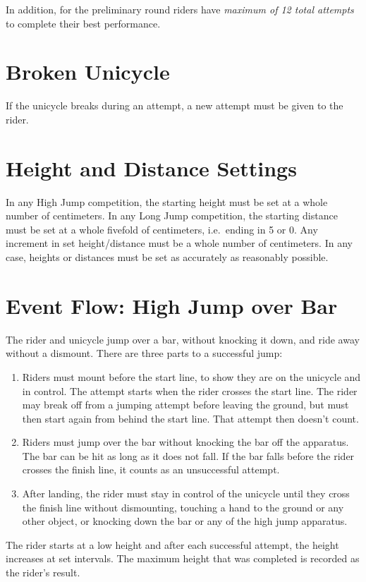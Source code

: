 In addition, for the preliminary round riders have \textit{maximum of 12 total attempts} to complete their best performance.

\section{Broken Unicycle}
If the unicycle breaks during an attempt, a new attempt must be given to the rider.

\section{Height and Distance Settings}

In any High Jump competition, the starting height must be set at a whole number of centimeters.
In any Long Jump competition, the starting distance must be set at a whole fivefold of centimeters, i.e.\ ending in 5 or 0.
Any increment in set height/distance must be a whole number of centimeters.
In any case, heights or distances must be set as accurately as reasonably possible.

\section{Event Flow: High Jump over Bar}
The rider and unicycle jump over a bar, without knocking it down, and ride away without a dismount.
There are three parts to a successful jump:
\begin{enumerate}
\item Riders must mount before the start line, to show they are on the unicycle and in control.
The attempt starts when the rider crosses the start line.
The rider may break off from a jumping attempt before leaving the ground, but must then start again from behind the start line.
That attempt then doesn't count.
\item Riders must jump over the bar without knocking the bar off the apparatus.
The bar can be hit as long as it does not fall.
If the bar falls before the rider crosses the finish line, it counts as an unsuccessful attempt.
\item After landing, the rider must stay in control of the unicycle until they cross the finish line without dismounting, touching a hand to the ground or any other object, or knocking down the bar or any of the high jump apparatus.
\end{enumerate}
The rider starts at a low height and after each successful attempt, the height increases at set intervals.
The maximum height that was completed is recorded as the rider's result.

